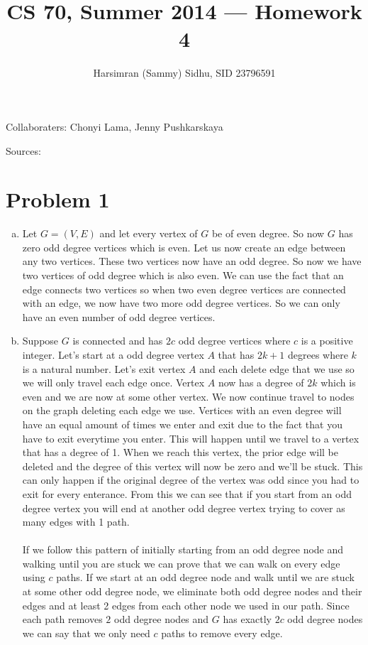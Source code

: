 \documentclass[11pt,letterpaper]{article}
\title{CS 70, Summer 2014 --- Homework 4} %
\author{Harsimran (Sammy) Sidhu, SID 23796591} %
\begin{document}
\maketitle

Collaboraters: Chonyi Lama, Jenny Pushkarskaya

Sources: 

\section*{Problem 1} %

\begin{enumerate}[(a)]
\item
Let $G=(V,E)$ and let every vertex of $G$ be of even degree. So now $G$ has zero odd degree vertices which is even. Let us now create an edge between any two vertices. These two vertices now have an odd degree. So now we have two vertices of odd degree which is also even. We can use the fact that an edge connects two vertices so when two even degree vertices are connected with an edge, we now have two more odd degree vertices. So we can only have an even number of odd degree vertices.
\\
\item
Suppose $G$ is connected and has $2c$ odd degree vertices where $c$ is a positive integer. Let's start at a odd degree vertex $A$ that has $2k+1$ degrees where $k$ is a natural number. Let's exit vertex $A$ and each delete edge that we use so we will only travel each edge once. Vertex $A$ now has a degree of $2k$ which is even and we are now at some other vertex. We now continue travel to nodes on the graph deleting each edge we use. Vertices with an even degree will have an equal amount of times we enter and exit due to the fact that you have to exit everytime you enter. This will happen until we travel to a vertex that has a degree of 1. When we reach this vertex, the prior edge will be deleted and the degree of this vertex will now be zero and we'll be stuck. This can only happen if the original degree of the vertex was odd since you had to exit for every enterance. From this we can see that if you start from an odd degree vertex you will end at another odd degree vertex trying to cover as many edges with 1 path.\\
\\
If we follow this pattern of initially starting from an odd degree node and walking until you are stuck we can prove that we can walk on every edge using $c$ paths. If we start at an odd degree node and walk until we are stuck at some other odd degree node, we eliminate both odd degree nodes and their edges and at least 2 edges from each other node we used in our path. Since each path removes $2$ odd degree nodes and $G$ has exactly $2c$ odd degree nodes we can say that we only need $c$ paths to remove every edge.\\

\end{enumerate}
\clearpage
\end{document}
